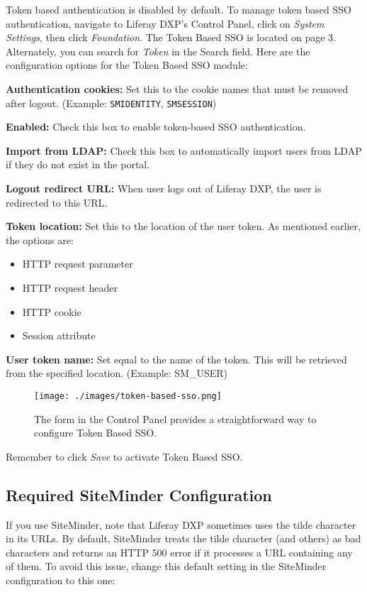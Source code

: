 Token based authentication is disabled by default. To manage token based
SSO authentication, navigate to Liferay DXP's Control Panel, click on
\emph{System Settings}, then click \emph{Foundation}. The Token Based
SSO is located on page 3. Alternately, you can search for \emph{Token}
in the Search field. Here are the configuration options for the Token
Based SSO module:

\textbf{Authentication cookies:} Set this to the cookie names that must
be removed after logout. (Example: \texttt{SMIDENTITY},
\texttt{SMSESSION})

\textbf{Enabled:} Check this box to enable token-based SSO
authentication.

\textbf{Import from LDAP:} Check this box to automatically import users
from LDAP if they do not exist in the portal.

\textbf{Logout redirect URL:} When user logs out of Liferay DXP, the
user is redirected to this URL.

\textbf{Token location:} Set this to the location of the user token. As
mentioned earlier, the options are:

\begin{itemize}
\tightlist
\item
  HTTP request parameter
\item
  HTTP request header
\item
  HTTP cookie
\item
  Session attribute
\end{itemize}

\textbf{User token name:} Set equal to the name of the token. This will
be retrieved from the specified location. (Example: SM\_USER)

\begin{figure}
\centering
\texttt{[image: ./images/token-based-sso.png]}
\caption{The form in the Control Panel provides a straightforward way to
configure Token Based SSO.}
\end{figure}

Remember to click \emph{Save} to activate Token Based SSO.

\subsection{Required SiteMinder
Configuration}\label{required-siteminder-configuration}

If you use SiteMinder, note that Liferay DXP sometimes uses the tilde
character in its URLs. By default, SiteMinder treats the tilde character
(and others) as bad characters and returns an HTTP 500 error if it
processes a URL containing any of them. To avoid this issue, change this
default setting in the SiteMinder configuration to this one:

